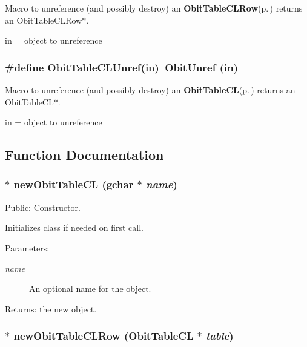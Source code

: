Macro to unreference (and possibly destroy) an {\bf Obit\-Table\-CLRow}{\rm (p.\,\pageref{structObitTableCLRow})} returns an Obit\-Table\-CLRow$\ast$. 

in = object to unreference 
\subsubsection{\setlength{\rightskip}{0pt plus 5cm}\#define Obit\-Table\-CLUnref(in)\ Obit\-Unref (in)}\label{ObitTableCL_8h_a1}


Macro to unreference (and possibly destroy) an {\bf Obit\-Table\-CL}{\rm (p.\,\pageref{structObitTableCL})} returns an Obit\-Table\-CL$\ast$. 

in = object to unreference 

\subsection{Function Documentation}
\subsubsection{$\ast$ new\-Obit\-Table\-CL (gchar $\ast$ {\em name})}\label{ObitTableCL_8h_a11}


Public: Constructor. 

Initializes class if needed on first call. \begin{Desc}
\item[Parameters:]
\begin{description}
\item[{\em name}]An optional name for the object. \end{description}
\end{Desc}
\begin{Desc}
\item[Returns:]the new object. \end{Desc}
\subsubsection{$\ast$ new\-Obit\-Table\-CLRow ({\bf Obit\-Table\-CL} $\ast$ {\em table})}\label{ObitTableCL_8h_a8}



